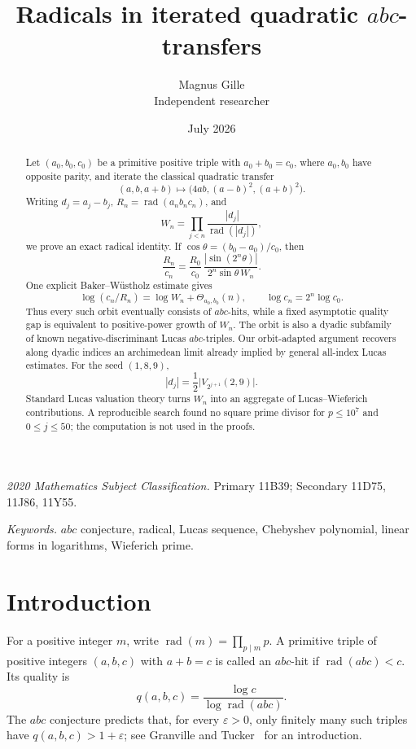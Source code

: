 \documentclass[11pt]{article}
\title{Radicals in iterated quadratic \(abc\)-transfers}
\author{Magnus Gille\\Independent researcher}
\date{July 2026}
\theoremstyle{remark}
\newcommand{\rad}{\operatorname{rad}}
\begin{document}
\maketitle

\begin{abstract}
Let \((a_0,b_0,c_0)\) be a primitive positive triple with
\(a_0+b_0=c_0\), where \(a_0,b_0\) have opposite parity, and iterate the
classical quadratic transfer
\[
 (a,b,a+b)\longmapsto\bigl(4ab,(a-b)^2,(a+b)^2\bigr).
\]
Writing \(d_j=a_j-b_j\), \(R_n=\rad(a_nb_nc_n)\), and
\[
 W_n=\prod_{j<n}\frac{|d_j|}{\rad(|d_j|)},
\]
we prove an exact radical identity.  If
\(\cos\theta=(b_0-a_0)/c_0\), then
\[
 \frac{R_n}{c_n}
 =\frac{R_0}{c_0}\,
   \frac{|\sin(2^n\theta)|}
        {2^n\sin\theta\,W_n}.
\]
One explicit Baker--Wüstholz estimate gives
\[
 \log(c_n/R_n)=\log W_n+\Theta_{a_0,b_0}(n),
 \qquad \log c_n=2^n\log c_0.
\]
Thus every such orbit eventually consists of \(abc\)-hits, while a fixed
asymptotic quality gap is equivalent to positive-power growth of \(W_n\).
The orbit is also a dyadic subfamily of known negative-discriminant
Lucas \(abc\)-triples.  Our orbit-adapted argument recovers along dyadic
indices an archimedean limit already implied by general all-index Lucas
estimates.  For the seed \((1,8,9)\),
\[
 |d_j|=\frac12\bigl|V_{2^{j+1}}(2,9)\bigr|.
\]
Standard Lucas
valuation theory turns \(W_n\) into an aggregate of Lucas--Wieferich
contributions.  A reproducible search found no square prime divisor for
\(p\leq10^7\) and \(0\leq j\leq50\); the computation is not used in the
proofs.
\end{abstract}

\noindent\textit{2020 Mathematics Subject Classification.}
Primary 11B39; Secondary 11D75, 11J86, 11Y55.

\smallskip
\noindent\textit{Keywords.}
\(abc\) conjecture, radical, Lucas sequence, Chebyshev polynomial,
linear forms in logarithms, Wieferich prime.

\section{Introduction}

For a positive integer \(m\), write
\(\rad(m)=\prod_{p\mid m}p\).  A primitive triple of positive integers
\((a,b,c)\) with \(a+b=c\) is called an \(abc\)-hit if
\(\rad(abc)<c\).  Its quality is
\[
 q(a,b,c)=\frac{\log c}{\log\rad(abc)}.
\]
The \(abc\) conjecture predicts that, for every \(\varepsilon>0\), only
finitely many such triples have \(q(a,b,c)>1+\varepsilon\); see
Granville and Tucker~\cite{GranvilleTucker2002} for an introduction.
\end{document}
